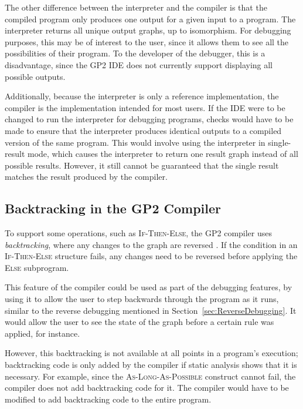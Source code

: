 \documentclass[authoryearcitations]{UoYCSproject}
\begin{document}
The other difference between the interpreter and the compiler is that the compiled
program only produces one output for a given input to a program. The interpreter
returns all unique output graphs, up to isomorphism. For debugging purposes, this
may be of interest to the user, since it allows them to see all the possibilities
of their program. To the developer of the debugger, this is a disadvantage, since
the GP2 IDE does not currently support displaying all possible outputs.

Additionally, because the interpreter is only a reference implementation, the
compiler is the implementation intended for most users. If the IDE were to be
changed to run the interpreter for debugging programs, checks would have to be
made to ensure that the interpreter produces identical outputs to a compiled
version of the same program. This would involve using the interpreter in
single-result mode, which causes the interpreter to return one result graph
instead of all possible results. However, it still cannot be guaranteed that
the single result matches the result produced by the compiler.


\subsection{Backtracking in the GP2 Compiler}
\label{sec:BacktrackingInTheGP2Compiler}

To support some operations, such as \textsc{If-Then-Else}, the GP2 compiler uses
\emph{backtracking}, where any changes to the graph are reversed \citep[ch. 5.8]{bak2015}.
If the condition in an \textsc{If-Then-Else} structure fails, any changes need
to be reversed before applying the \textsc{Else} subprogram.

This feature of the compiler could be used as part of the debugging features,
by using it to allow the user to step backwards through the program as it runs,
similar to the reverse debugging mentioned in Section~\ref{sec:ReverseDebugging}.
It would allow the user to see the state of the graph before a certain rule was
applied, for instance.

However, this backtracking is not available at all points in a program's
execution; backtracking code is only added by the compiler if static analysis
shows that it is necessary. For example, since the \textsc{As-Long-As-Possible}
construct cannot fail, the compiler does not add backtracking code for it. The
compiler would have to be modified to add backtracking code to the entire
program.
\end{document}
